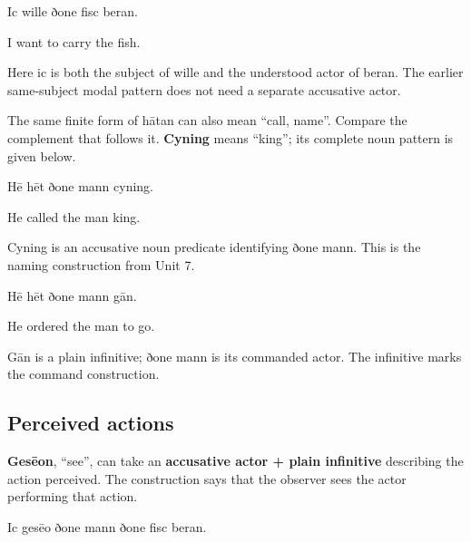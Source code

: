 Ic wille ðone fisc beran.

I want to carry the fish.

Here ic is both the subject of wille and the understood actor of beran. The earlier same-subject modal pattern does not need a separate accusative actor.

The same finite form of hātan can also mean “call, name”. Compare the complement that follows it. \textbf{Cyning} means “king”; its complete noun pattern is given below.

Hē hēt ðone mann cyning.

He called the man king.

Cyning is an accusative noun predicate identifying ðone mann. This is the naming construction from Unit 7.

Hē hēt ðone mann gān.

He ordered the man to go.

Gān is a plain infinitive; ðone mann is its commanded actor. The infinitive marks the command construction.

\subsection*{Perceived actions}

\textbf{Gesēon}, “see”, can take an \textbf{accusative actor + plain infinitive} describing the action perceived. The construction says that the observer sees the actor performing that action.

Ic gesēo ðone mann ðone fisc beran.

